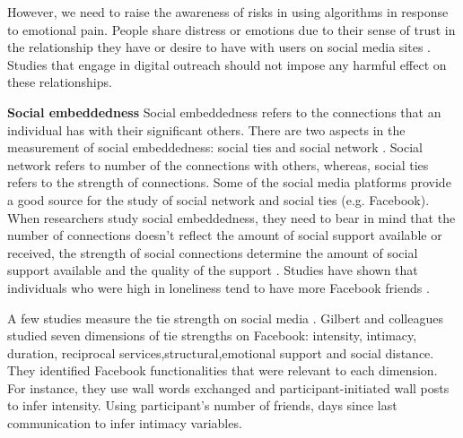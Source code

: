 However, we need to raise the awareness of risks in using algorithms in response to emotional pain. People share distress or emotions due to their sense of trust in the relationship they have or desire to have with users on social media sites \cite{brownlie2018looking}. Studies that engage in digital outreach should not impose any harmful effect on these relationships.

\textbf{Social embeddedness}
Social embeddedness refers to the connections that an individual has with their significant others. There are two aspects in the measurement of social embeddedness: social ties and social network \cite{sarason1983assessing}. Social network refers to number of the connections with others, whereas, social ties refers to the strength of connections. Some of the social media platforms provide a good source for the study of social network and social ties (e.g. Facebook). When researchers study social embeddedness, they need to bear in mind that the number of connections doesn't reflect the amount of social support available or received, the strength of social connections determine the amount of social support available and the quality of the support \cite{burke2010social}. Studies have shown that individuals who were high in loneliness tend to have more Facebook friends \cite{skues_effects_2012}.  

A few studies measure the tie strength on social media \cite{xiang2010modeling}. Gilbert and colleagues \citet{gilbert2009predicting} studied seven dimensions of tie strengths on Facebook: intensity, intimacy, duration, reciprocal services,structural,emotional support and social distance. They identified Facebook functionalities that were relevant to each dimension. For instance, they use wall words exchanged and participant-initiated wall posts to infer intensity. Using participant’s number of friends, days since last communication to infer intimacy variables. 


